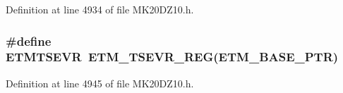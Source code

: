 Definition at line 4934 of file M\+K20\+D\+Z10.\+h.

\subsubsection[{\texorpdfstring{E\+T\+M\+T\+S\+E\+VR}{ETMTSEVR}}]{\setlength{\rightskip}{0pt plus 5cm}\#define E\+T\+M\+T\+S\+E\+VR~{\bf E\+T\+M\+\_\+\+T\+S\+E\+V\+R\+\_\+\+R\+EG}({\bf E\+T\+M\+\_\+\+B\+A\+S\+E\+\_\+\+P\+TR})}\hypertarget{group___e_t_m___register___accessor___macros_gac723b56b3c26acc0313977b32665b6a8}{}\label{group___e_t_m___register___accessor___macros_gac723b56b3c26acc0313977b32665b6a8}


Definition at line 4945 of file M\+K20\+D\+Z10.\+h.

